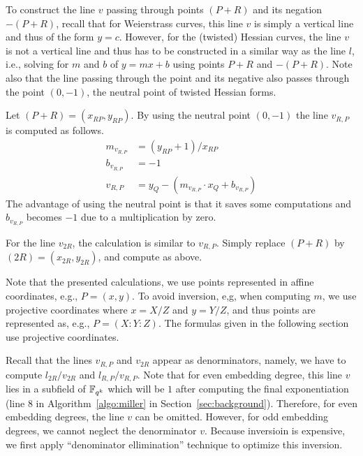 To construct the line $v$ passing through points $(P+R)$ and its negation $-(P+R)$,
recall that for Weierstrass curves,
this line $v$ is simply a vertical line
and thus of the form $y = c$.
However, for the (twisted) Hessian curves, the line $v$ is not a vertical line
and thus has to be constructed in a similar way as the line $l$,
i.e., solving for $m$ and $b$ of $y = mx + b$ using points $P+R$ and $-(P+R)$.
Note also that the line passing through the point and its negative also passes through
the point $(0,-1)$, the neutral point of twisted Hessian forms.

Let $(P+R) = (x_{RP},y_{RP})$.
By using the neutral point $(0,-1)$
the line $v_{R,P}$ is computed as follows.
\begin{align*}
m_{v_{R,P}} &= (y_{RP} + 1) / x_{RP}	\\
b_{v_{R,P}} &= -1			\\
v_{R,P} &= y_Q - (m_{v_{R,P}} \cdot x_Q + b_{v_{R,P}})
\end{align*}
The advantage of using the neutral point is that
it saves some computations and $b_{v_{R,P}}$ becomes $-1$
due to a multiplication by zero.

For the line $v_{2R}$,
the calculation is similar to $v_{R,P}$.
Simply replace $(P+R)$ by $(2R) = (x_{2R}, y_{2R})$,
and compute as above.

Note that the presented calculations,
we use points represented in affine coordinates,
e.g., $P = (x,y)$.
To avoid inversion, e,g, when computing $m$,
we use projective coordinates where
$x = X/Z$ and $y = Y/Z$,
and thus points are represented as, e.g., $P = (X : Y : Z)$.
The formulas given in the following section use projective coordinates.

Recall that the lines $v_{R,P}$ and $v_{2R}$ appear as denorminators,
namely, we have to compute $l_{2R}/v_{2R}$ and $l_{R,P}/v_{R,P}$.
Note that for even embedding degree,
this line $v$ lies in a subfield of $\mathbb{F}_{q^k}$
which will be $1$ after computing the final exponentiation
(line 8 in Algorithm~\ref{algo:miller} in Section~\ref{sec:background}).
Therefore, for even embedding degrees, the line $v$ can be omitted.
However, for odd embedding degrees, we cannot neglect the denorminator $v$.
Because inversioin is expensive,
we first apply ``denominator ellimination'' technique to optimize this inversion.


